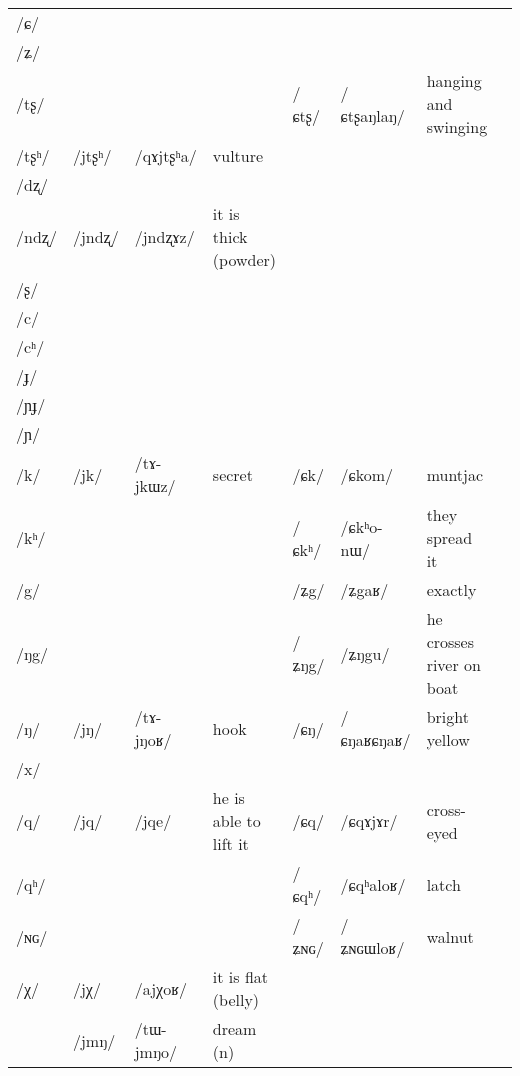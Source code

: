\documentclass[oldfontcommands,oneside,a4paper,11pt]{article}
\newcommand{\ipa}[1]{\mbox{/#1/}} %
\newcommand{\deux}[1]{/#1/}
\newcommand{\trois}[1]{/#1/}
\newcommand{\idph}[1]{\cellcolor{gray}\textbf{#1}}
\begin{document}
\begin{landscape}
\begin{longtable}{l|lll|lll|l}
\ipa{ɕ}  & 	  & 	  & 	  & 	  & 	  & 	  & 	\\
\ipa{ʑ}  & 	  & 	  & 	  & 	  & 	  & 	  & 	\\
\ipa{tʂ}  & 	  & 	  & 	  & 	 \deux{ɕtʂ} \idph{}  & 	 \ipa{ɕtʂaŋlaŋ}  & 	 hanging and swinging & 	\\
\ipa{tʂʰ}  & 	 \deux{jtʂʰ}  & 	 \ipa{qɤjtʂʰa}  & 	vulture  & 	  & 	  & 	  & 	\\
\ipa{dʐ}  & 	  & 	  & 	  & 	  & 	  & 	  & 	\\
\ipa{ndʐ}  & 	 \deux{jndʐ}  & 	 \ipa{jndʐɤz}  & 	it is thick (powder)  & 	  & 	  & 	  & 	\\
\ipa{ʂ}  & 	  & 	  & 	  & 	  & 	  & 	  & 	\\
\ipa{c}  & 	  & 	  & 	  & 	  & 	  & 	  & 	\\
\ipa{cʰ}  & 	  & 	  & 	  & 	  & 	  & 	  & 	\\
\ipa{ɟ}  & 	  & 	  & 	  & 	  & 	  & 	  & 	\\
\ipa{ɲɟ}  & 	  & 	  & 	  & 	  & 	  & 	  & 	\\
\ipa{ɲ}  & 	  & 	  & 	  & 	  & 	  & 	  & 	\\
\ipa{k}  &	 \deux{jk}  &	 \ipa{tɤ-jkɯz}  &	 secret  &	 \deux{ɕk}  &	 \ipa{ɕkom}  &	 muntjac  &	\\
\ipa{kʰ}  &	  &	  &	  &	 \deux{ɕkʰ}  &	 \ipa{ɕkʰo-nɯ}  &	 they spread it  &	\\
\ipa{g}  &	  &	  &	  &	 \deux{ʑg}  &	 \ipa{ʑgaʁ}  &	 exactly  &	\\
\ipa{ŋg}  &	  &	  &	  &	 \deux{ʑŋg}  &	 \ipa{ʑŋgu}  &	 he crosses river on boat  &	\\
\ipa{ŋ}  &	 \deux{jŋ}  &	 \ipa{tɤ-jŋoʁ}  &	 hook  &	 \deux{ɕŋ} \idph{}  &	 \ipa{ɕŋaʁɕŋaʁ}  &	 bright yellow  &	\\
\ipa{x}  &	  &	  &	  &	  &	  &	  &	\\
\ipa{q}  &	 \deux{jq}  &	 \ipa{jqe}  &	 he is able to lift it  &	 \deux{ɕq}  &	 \ipa{ɕqɤjɤr}  &	 cross-eyed  &	\\
\ipa{qʰ}  &	  &	  &	  &	 \deux{ɕqʰ}  &	 \ipa{ɕqʰaloʁ}  &	 latch  &	\\
\ipa{ɴɢ}  &	  &	  &	  &	 \deux{ʑɴɢ}  &	 \ipa{ʑɴɢɯloʁ}  &	 walnut  &	\\
\ipa{χ}  &	 \deux{jχ}  &	 \ipa{ajχoʁ}  &	 it is flat (belly)  &	  &	  &	  &	\\
\midrule  					 
 &\trois{jmŋ} & \ipa{tɯ-jmŋo} &dream (n) \\  
\end{longtable}



\end{landscape}
\end{document}

